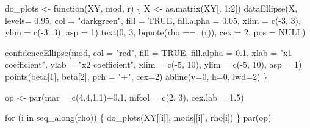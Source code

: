 \documentclass[
  letterpaper,
  10pt,
  krantz2]{krantz}
\makeatletter
\newenvironment{Shaded}{\begin{snugshade}}{\end{snugshade}}
\newcommand{\AttributeTok}[1]{\textcolor[rgb]{0.40,0.45,0.13}{#1}}
\newcommand{\ConstantTok}[1]{\textcolor[rgb]{0.56,0.35,0.01}{#1}}
\newcommand{\ControlFlowTok}[1]{\textcolor[rgb]{0.00,0.23,0.31}{#1}}
\newcommand{\DecValTok}[1]{\textcolor[rgb]{0.68,0.00,0.00}{#1}}
\newcommand{\FloatTok}[1]{\textcolor[rgb]{0.68,0.00,0.00}{#1}}
\newcommand{\FunctionTok}[1]{\textcolor[rgb]{0.28,0.35,0.67}{#1}}
\newcommand{\NormalTok}[1]{\textcolor[rgb]{0.00,0.23,0.31}{#1}}
\newcommand{\OtherTok}[1]{\textcolor[rgb]{0.00,0.23,0.31}{#1}}
\newcommand{\SpecialCharTok}[1]{\textcolor[rgb]{0.37,0.37,0.37}{#1}}
\newcommand{\StringTok}[1]{\textcolor[rgb]{0.13,0.47,0.30}{#1}}
\newenvironment{kframe}{%
  \medskip{}
  \setlength{\fboxsep}{.8em}
  \def\at@end@of@kframe{}%
  \ifinner\ifhmode%
  \def\at@end@of@kframe{\end{minipage}}%
  \begin{minipage}{\columnwidth}%
  \fi\fi%
  \def\FrameCommand##1{\hskip\@totalleftmargin \hskip-\fboxsep
  \colorbox{shadecolor}{##1}\hskip-\fboxsep
      \hskip-\linewidth \hskip-\@totalleftmargin \hskip\columnwidth}%
  \MakeFramed {\advance\hsize-\width
    \@totalleftmargin\z@ \linewidth\hsize
    \@setminipage}}%
{\par\unskip\endMakeFramed%
  \at@end@of@kframe}
\renewenvironment{Shaded}{\begin{kframe}}{\end{kframe}}
\makeatother
\begin{document}
\begin{Shaded}
\begin{Highlighting}[]
\NormalTok{do\_plots }\OtherTok{\textless{}{-}} \ControlFlowTok{function}\NormalTok{(XY, mod, r) \{}
\NormalTok{  X }\OtherTok{\textless{}{-}} \FunctionTok{as.matrix}\NormalTok{(XY[, }\DecValTok{1}\SpecialCharTok{:}\DecValTok{2}\NormalTok{])}
  \FunctionTok{dataEllipse}\NormalTok{(X,}
              \AttributeTok{levels=} \FloatTok{0.95}\NormalTok{,}
              \AttributeTok{col =} \StringTok{"darkgreen"}\NormalTok{,}
              \AttributeTok{fill =} \ConstantTok{TRUE}\NormalTok{, }\AttributeTok{fill.alpha =} \FloatTok{0.05}\NormalTok{,}
              \AttributeTok{xlim =} \FunctionTok{c}\NormalTok{(}\SpecialCharTok{{-}}\DecValTok{3}\NormalTok{, }\DecValTok{3}\NormalTok{),}
              \AttributeTok{ylim =} \FunctionTok{c}\NormalTok{(}\SpecialCharTok{{-}}\DecValTok{3}\NormalTok{, }\DecValTok{3}\NormalTok{), }\AttributeTok{asp =} \DecValTok{1}\NormalTok{)}
  \FunctionTok{text}\NormalTok{(}\DecValTok{0}\NormalTok{, }\DecValTok{3}\NormalTok{, }\FunctionTok{bquote}\NormalTok{(rho }\SpecialCharTok{==}\NormalTok{ .(r)), }\AttributeTok{cex =} \DecValTok{2}\NormalTok{, }\AttributeTok{pos =} \ConstantTok{NULL}\NormalTok{)}

  \FunctionTok{confidenceEllipse}\NormalTok{(mod,}
                    \AttributeTok{col =} \StringTok{"red"}\NormalTok{,}
                    \AttributeTok{fill =} \ConstantTok{TRUE}\NormalTok{, }\AttributeTok{fill.alpha =} \FloatTok{0.1}\NormalTok{,}
                    \AttributeTok{xlab =} \StringTok{"x1 coefficient"}\NormalTok{,}
                    \AttributeTok{ylab =} \StringTok{"x2 coefficient"}\NormalTok{,}
                    \AttributeTok{xlim =} \FunctionTok{c}\NormalTok{(}\SpecialCharTok{{-}}\DecValTok{5}\NormalTok{, }\DecValTok{10}\NormalTok{),}
                    \AttributeTok{ylim =} \FunctionTok{c}\NormalTok{(}\SpecialCharTok{{-}}\DecValTok{5}\NormalTok{, }\DecValTok{10}\NormalTok{),}
                    \AttributeTok{asp =} \DecValTok{1}\NormalTok{)}
  \FunctionTok{points}\NormalTok{(beta[}\DecValTok{1}\NormalTok{], beta[}\DecValTok{2}\NormalTok{], }\AttributeTok{pch =} \StringTok{"+"}\NormalTok{, }\AttributeTok{cex=}\DecValTok{2}\NormalTok{)}
  \FunctionTok{abline}\NormalTok{(}\AttributeTok{v=}\DecValTok{0}\NormalTok{, }\AttributeTok{h=}\DecValTok{0}\NormalTok{, }\AttributeTok{lwd=}\DecValTok{2}\NormalTok{)}
\NormalTok{\}}

\NormalTok{op }\OtherTok{\textless{}{-}} \FunctionTok{par}\NormalTok{(}\AttributeTok{mar =} \FunctionTok{c}\NormalTok{(}\DecValTok{4}\NormalTok{,}\DecValTok{4}\NormalTok{,}\DecValTok{1}\NormalTok{,}\DecValTok{1}\NormalTok{)}\SpecialCharTok{+}\FloatTok{0.1}\NormalTok{,}
          \AttributeTok{mfcol =} \FunctionTok{c}\NormalTok{(}\DecValTok{2}\NormalTok{, }\DecValTok{3}\NormalTok{),}
          \AttributeTok{cex.lab =} \FloatTok{1.5}\NormalTok{)}

\ControlFlowTok{for}\NormalTok{ (i }\ControlFlowTok{in} \FunctionTok{seq\_along}\NormalTok{(rho)) \{}
  \FunctionTok{do\_plots}\NormalTok{(XY[[i]], mods[[i]], rho[i])}
\NormalTok{\}}
\FunctionTok{par}\NormalTok{(op)}
\end{Highlighting}
\end{Shaded}
\end{document}

